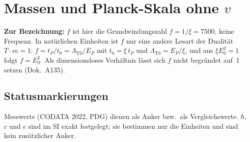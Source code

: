
\providecommand{\BM}{\textbf{[B]}}
\providecommand{\KM}{\textbf{[K]}}
\providecommand{\SM}{\textbf{[S]}}

\chapter*{Massen und Planck-Skala ohne \texorpdfstring{$v$}{v}}

\begin{abstract}
Die Leptonleiter des Korpus schreibt die Massen als $m_i=r_i\,\xi^{p_i}\,v$ und benutzt
die elektroschwache Skala $v$ als Zwischengröße; die Planck-Skala wird getrennt über
die Formel für $G$ mit dem Umrechnungsfaktor $C_{\text{conv}}$ erreicht. So gelesen
sieht es aus, als brauche die Rechnung zwei Anker, einen für $v$ und einen für $E_P$.
Das ist nicht der Fall. Dok.~149 verbindet $v$ und $E_P$ direkt:
$v=E_P/(f^4\cdot(\pi/2)\cdot10)$, also $v/E_P=\xi^4/(5\pi)=2{,}012\times10^{-17}$,
$-0{,}23\,\%$ gegen den gemessenen Wert \KM. Setzt man das in die Leiter ein, fällt
$v$ heraus: $m_i=\frac{r_i}{5\pi}\,\xi^{p_i+4}\,E_P$ \BM. Damit hängen alle drei
Leptonmassen, $E_P$, $G$, $\ell_P$ und $L_0$ an einer einzigen Kette, und ein einziger
Messwert als Anker legt alle Zahlen fest. Mit $m_e$ als Anker folgen
$E_P=1{,}237\times10^{19}$\,GeV ($+1{,}34\,\%$), $G=6{,}50\times10^{-11}$
($-2{,}6\,\%$), $\ell_P=1{,}595\times10^{-35}$\,m und $L_0=2{,}127\times10^{-39}$\,m
\KM. Die Abweichungen sind die bekannten bare-Reste der Leiter, kein zweiter Anker.
\end{abstract}

\noindent\textbf{Zur Bezeichnung:} $f$ ist hier die Grundwindungszahl $f = 1/\xi = 7500$, keine Frequenz. In natürlichen Einheiten ist $f$ nur eine andere Lesart der Dualität $T\cdot m = 1$: $f = t_P/t_0 = \Lambda_{\text{T0}}/E_P$ mit $t_0 = \xi\,t_P$ und $\Lambda_{\text{T0}} = E_P/\xi$, und aus $\xi E_0^2 = 1$ folgt $f = E_0^2$. Als dimensionsloses Verhältnis lässt sich $f$ nicht begründet auf~1 setzen (Dok.~A135).

\section*{Statusmarkierungen}

Messwerte (CODATA 2022, PDG) dienen als Anker bzw.\ als Vergleichswerte. $\hbar$, $c$
und $e$ sind im SI exakt festgelegt; sie bestimmen nur die Einheiten und sind kein
zusätzlicher Anker.


